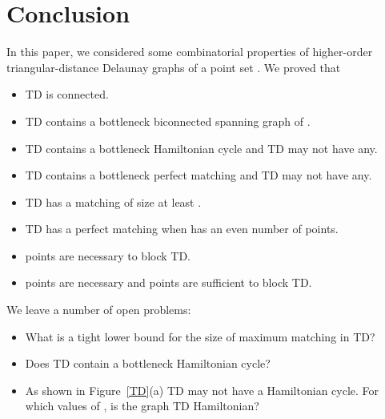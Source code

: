 \documentclass[11pt,a4paper]{article}
\newcommand{\kTD}[2]{\text{-}TD#2}
\begin{document}
\section{Conclusion}
\label{conclusion}
In this paper, we considered some combinatorial properties of higher-order triangular-distance Delaunay graphs of a point set . We proved that
\begin{itemize}

  \item \kTD{k}{} is  connected.
  \item \kTD{2}{} contains a bottleneck biconnected spanning graph of .
  \item \kTD{7}{} contains a bottleneck Hamiltonian cycle and \kTD{5}{} may not have any.
  \item \kTD{6}{} contains a bottleneck perfect matching and \kTD{5}{} may not have any.
  \item \kTD{1}{} has a matching of size at least .
  \item \kTD{2}{} has a perfect matching when  has an even number of points.
  \item  points are necessary to block \kTD{0}{}.
  \item  points are necessary and  points are sufficient to block \kTD{k}{}.
\end{itemize}

We leave a number of open problems:
\begin{itemize}

  \item What is a tight lower bound for the size of maximum matching in \kTD{1}{}?
  \item Does \kTD{6}{} contain a bottleneck Hamiltonian cycle?
 \item As shown in Figure~\ref{TD}(a) \kTD{0}{} may not have a Hamiltonian cycle. For which values of , is the graph \kTD{k}{} Hamiltonian?
\end{itemize}



\end{document}
